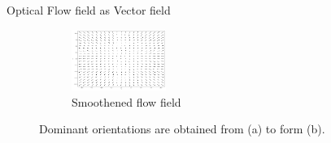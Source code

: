 \documentclass{beamer}
\begin{document}
\begin{frame}{Optical Flow field as Vector field}
\begin{figure}[h]
\begin{subfigure}[t]{.5\textwidth}
         		\includegraphics[height =2cm,width=0.7\linewidth]{images/noiseless_phase.png}
         		\caption{Smoothened flow field }
         		
         	\end{subfigure}

         	
         	\caption{Dominant orientations are obtained from (a) to form (b).}
         	\label{umn_norm_ex}
         \end{figure}




%
%
%
% 
%    	

\end{frame}
\end{document}
